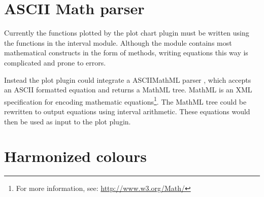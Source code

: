 \section{ASCII Math parser}
Currently the functions plotted by the plot chart plugin must be written using the functions in the interval module. Although the module contains most mathematical constructs in the form of methods, writing equations this way is complicated and prone to errors.

Instead the plot plugin could integrate a ASCIIMathML parser \cite{jipsen07}, which accepts an ASCII formatted equation and returns a MathML tree. MathML is an XML specification for encoding mathematic equations\footnote{For more information, see: \url{http://www.w3.org/Math/}}. The MathML tree could be rewritten to output equations using interval arithmetic. These equations would then be used as input to the plot plugin.

\section{Harmonized colours}


